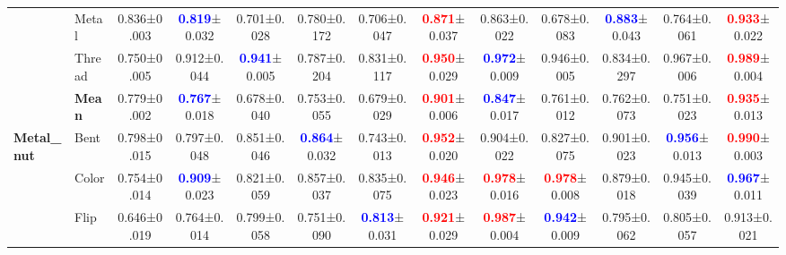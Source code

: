 \documentclass[10pt,twocolumn,letterpaper]{article}
\begin{document}
\begin{table*}[bt]
{\begin{tabular}{l@{}l@{}|c||ccccc||ccccc}
          & Metal & 0.836\footnotesize{±0.003}& \textcolor{blue}{\textbf{0.819}}\footnotesize{±0.032}& 0.701\footnotesize{±0.028}& 0.780\footnotesize{±0.172}& 0.706\footnotesize{±0.047}& \textcolor{red}{\textbf{0.871}}\footnotesize{±0.037}& 0.863\footnotesize{±0.022}& 0.678\footnotesize{±0.083}& \textcolor{blue}{\textbf{0.883}}\footnotesize{±0.043}& 0.764\footnotesize{±0.061}& \textcolor{red}{\textbf{0.933}}\footnotesize{±0.022} \\
          & Thread & 0.750\footnotesize{±0.005}& 0.912\footnotesize{±0.044}& \textcolor{blue}{\textbf{0.941}}\footnotesize{±0.005}& 0.787\footnotesize{±0.204}& 0.831\footnotesize{±0.117}& \textcolor{red}{\textbf{0.950}}\footnotesize{±0.029}& \textcolor{blue}{\textbf{0.972}}\footnotesize{±0.009}& 0.946\footnotesize{±0.005}& 0.834\footnotesize{±0.297}& 0.967\footnotesize{±0.006}& \textcolor{red}{\textbf{0.989}}\footnotesize{±0.004} \\
          \cline{2-13}
          & \textbf{Mean} & 0.779\footnotesize{±0.002}& \textcolor{blue}{\textbf{0.767}}\footnotesize{±0.018}& 0.678\footnotesize{±0.040}& 0.753\footnotesize{±0.055}& 0.679\footnotesize{±0.029}& \textcolor{red}{\textbf{0.901}}\footnotesize{±0.006}& \textcolor{blue}{\textbf{0.847}}\footnotesize{±0.017}& 0.761\footnotesize{±0.012}& 0.762\footnotesize{±0.073}& 0.751\footnotesize{±0.023}& \textcolor{red}{\textbf{0.935}}\footnotesize{±0.013} \\
    \hline
    \multirow{5}[0]{*}{\textbf{Metal\_nut}} & Bent & 0.798\footnotesize{±0.015}& 0.797\footnotesize{±0.048}& 0.851\footnotesize{±0.046}& \textcolor{blue}{\textbf{0.864}}\footnotesize{±0.032}& 0.743\footnotesize{±0.013}& \textcolor{red}{\textbf{0.952}}\footnotesize{±0.020}& 0.904\footnotesize{±0.022}& 0.827\footnotesize{±0.075}& 0.901\footnotesize{±0.023}& \textcolor{blue}{\textbf{0.956}}\footnotesize{±0.013}& \textcolor{red}{\textbf{0.990}}\footnotesize{±0.003} \\
          & Color & 0.754\footnotesize{±0.014}& \textcolor{blue}{\textbf{0.909}}\footnotesize{±0.023}& 0.821\footnotesize{±0.059}& 0.857\footnotesize{±0.037}& 0.835\footnotesize{±0.075}& \textcolor{red}{\textbf{0.946}}\footnotesize{±0.023}& \textcolor{red}{\textbf{0.978}}\footnotesize{±0.016}& \textcolor{red}{\textbf{0.978}}\footnotesize{±0.008}& 0.879\footnotesize{±0.018}& 0.945\footnotesize{±0.039}& \textcolor{blue}{\textbf{0.967}}\footnotesize{±0.011} \\
          & Flip & 0.646\footnotesize{±0.019}& 0.764\footnotesize{±0.014}& 0.799\footnotesize{±0.058}& 0.751\footnotesize{±0.090}& \textcolor{blue}{\textbf{0.813}}\footnotesize{±0.031}& \textcolor{red}{\textbf{0.921}}\footnotesize{±0.029}& \textcolor{red}{\textbf{0.987}}\footnotesize{±0.004}& \textcolor{blue}{\textbf{0.942}}\footnotesize{±0.009}& 0.795\footnotesize{±0.062}& 0.805\footnotesize{±0.057}& 0.913\footnotesize{±0.021} \\

\end{tabular}}
\end{table*}
\end{document}
